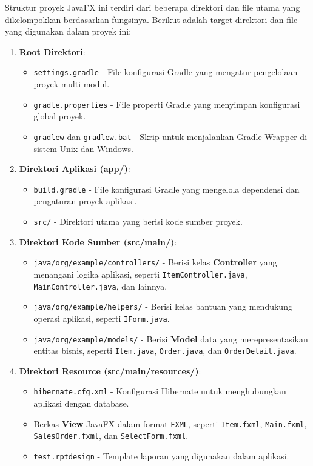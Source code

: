 Struktur proyek JavaFX ini terdiri dari beberapa direktori dan file utama yang dikelompokkan berdasarkan fungsinya. Berikut adalah target direktori dan file yang digunakan dalam proyek ini:

\begin{enumerate}
	\item \textbf{Root Direktori}:
	\begin{itemize}
		\item \texttt{settings.gradle} - File konfigurasi Gradle yang mengatur pengelolaan proyek multi-modul.
		\item \texttt{gradle.properties} - File properti Gradle yang menyimpan konfigurasi global proyek.
		\item \texttt{gradlew} dan \texttt{gradlew.bat} - Skrip untuk menjalankan Gradle Wrapper di sistem Unix dan Windows.
	\end{itemize}
	
	\item \textbf{Direktori Aplikasi (app/)}:
	\begin{itemize}
		\item \texttt{build.gradle} - File konfigurasi Gradle yang mengelola dependensi dan pengaturan proyek aplikasi.
		\item \texttt{src/} - Direktori utama yang berisi kode sumber proyek.
	\end{itemize}
	
	\item \textbf{Direktori Kode Sumber (src/main/)}:
	\begin{itemize}
		\item \texttt{java/org/example/controllers/} - Berisi kelas \textbf{Controller} yang menangani logika aplikasi, seperti \texttt{ItemController.java}, \texttt{MainController.java}, dan lainnya.
		\item \texttt{java/org/example/helpers/} - Berisi kelas bantuan yang mendukung operasi aplikasi, seperti \texttt{IForm.java}.
		\item \texttt{java/org/example/models/} - Berisi \textbf{Model} data yang merepresentasikan entitas bisnis, seperti \texttt{Item.java}, \texttt{Order.java}, dan \texttt{OrderDetail.java}.
	\end{itemize}
	
	\item \textbf{Direktori Resource (src/main/resources/)}:
	\begin{itemize}
		\item \texttt{hibernate.cfg.xml} - Konfigurasi Hibernate untuk menghubungkan aplikasi dengan database.
		\item Berkas \textbf{View} JavaFX dalam format \texttt{FXML}, seperti \texttt{Item.fxml}, \texttt{Main.fxml}, \texttt{SalesOrder.fxml}, dan \texttt{SelectForm.fxml}.
		\item \texttt{test.rptdesign} - Template laporan yang digunakan dalam aplikasi.
	\end{itemize}
\end{enumerate}


